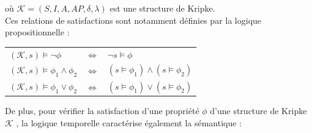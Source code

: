 \documentclass[runningheads,a4paper,10pt]{llncs}
\begin{document}
où $\mathcal{K} = (S,I,A,AP,\delta,\lambda)$ est une structure de Kripke.\\

Ces relations de satisfactions sont notamment définies par la logique propositionnelle : 

\begin{center}
\begin{tabular}{lll}
   $(\mathcal{K},s) \vDash \neg\phi$ & \hspace{0.5cm} $\Leftrightarrow$ \hspace{0.5cm} & $\neg s \vDash \phi$  \\
   $(\mathcal{K},s) \vDash \phi_{1} \wedge \phi_{2} $ & \hspace{0.5cm} $\Leftrightarrow$ \hspace{0.5cm} & $(s \vDash \phi_{1}) \wedge (s \vDash \phi_{2})$ \\
   $(\mathcal{K},s) \vDash \phi_{1} \vee \phi_{2} $ & \hspace{0.5cm} $\Leftrightarrow$ \hspace{0.5cm} & $(s \vDash \phi_{1}) \vee (s \vDash \phi_{2})$ \\
\end{tabular}
\end{center}

De plus, pour vérifier la satisfaction d'une propriété $\phi$ d'une structure de Kripke $\mathcal{K}$ , la logique temporelle caractérise également la sémantique :
\end{document}
